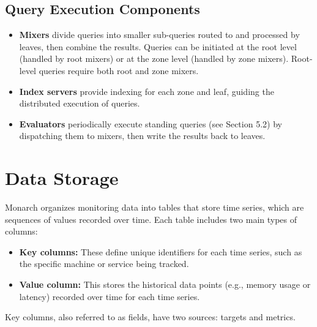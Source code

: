 \subsection*{Query Execution Components}

\begin{itemize}
    \item \textbf{Mixers} divide queries into smaller sub-queries routed to and processed by leaves, then combine the results. Queries can be initiated at the root level (handled by root mixers) or at the zone level (handled by zone mixers). Root-level queries require both root and zone mixers.
    \item \textbf{Index servers} provide indexing for each zone and leaf, guiding the distributed execution of queries.
    \item \textbf{Evaluators} periodically execute standing queries (see Section 5.2) by dispatching them to mixers, then write the results back to leaves.
\end{itemize}

\section{Data Storage}

Monarch organizes monitoring data into tables that store time series, which are sequences of values recorded over time. Each table includes two main types of columns:

\begin{itemize}
    \item \textbf{Key columns:} These define unique identifiers for each time series, such as the specific machine or service being tracked.
    \item \textbf{Value column:} This stores the historical data points (e.g., memory usage or latency) recorded over time for each time series.
\end{itemize}

Key columns, also referred to as fields, have two sources: targets and metrics.

